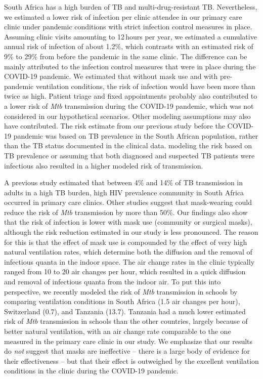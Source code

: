 \documentclass[fleqn,11pt]{wlscirep}
\begin{document}
South Africa has a high burden of TB and multi-drug-resistant TB\cite{WHO2023TBReport}. Nevertheless, we estimated a lower risk of infection per clinic attendee in our primary care clinic under pandemic conditions with strict infection control measures in place. Assuming clinic visits amounting to 12\,hours per year, we estimated a cumulative annual risk of infection of about 1.2\%, which contrasts with an estimated risk of 9\% to 29\% from before the pandemic in the same clinic\cite{Zurcher2022JID}. The difference can be mainly attributed to the infection control measures that were in place during the COVID-19 pandemic. We estimated that without mask use and with pre-pandemic ventilation conditions, the risk of infection would have been more than twice as high. Patient triage and fixed appointments probably also contributed to a lower risk of \emph{Mtb} transmission during the COVID-19 pandemic, which was not considered in our hypothetical scenarios. Other modeling assumptions may also have contributed. The risk estimate from our previous study before the COVID-19 pandemic\cite{Zurcher2022JID} was based on TB prevalence in the South African population, rather than the TB status documented in the clinical data. modeling the risk based on TB prevalence or assuming that both diagnosed and suspected TB patients were infectious also resulted in a higher modeled risk of transmission. 

A previous study estimated that between 4\% and 14\% of TB transmission in adults in a high TB burden, high HIV prevalence community in South Africa occurred in primary care clinics\cite{McCreesh2022BMJGlobalHealth}. Other studies suggest that mask-wearing could reduce the risk of \emph{Mtb} transmission by more than 50\%\cite{Dharmadhikari2012AJRCCM,McCreesh2021BMJGlobalHealth}. Our findings also show that the risk of infection is lower with mask use (community or surgical masks), although the risk reduction estimated in our study is less pronounced. The reason for this is that the effect of mask use is compounded by the effect of very high natural ventilation rates, which determine both the diffusion and the removal of infectious quanta in the indoor space. The air change rates in the clinic typically ranged from 10 to 20 air changes per hour, which resulted in a quick diffusion and removal of infectious quanta from the indoor air. To put this into perspective, we recently modeled the risk of \emph{Mtb} transmission in schools by comparing ventilation conditions in South Africa (1.5 air changes per hour), Switzerland (0.7), and Tanzania (13.7)\cite{Banholzer2024PGPH}. Tanzania had a much lower estimated risk of \emph{Mtb} transmission in schools than the other countries, largely because of better natural ventilation, with an air change rate comparable to the one measured in the primary care clinic in our study. We emphasize that our results do \emph{not} suggest that masks are ineffective -- there is a large body of evidence for their effectiveness -- but that their effect is outweighed by the excellent ventilation conditions in the clinic during the COVID-19 pandemic.
\end{document}
